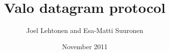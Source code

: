 \title{Valo datagram protocol}
\author{Joel Lehtonen and Esa-Matti Suuronen}
\date{November 2011}
\maketitle
